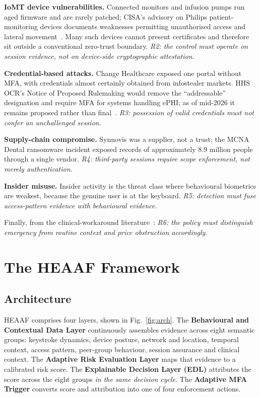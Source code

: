 \documentclass[conference]{IEEEtran}
\begin{document}
\textbf{IoMT device vulnerabilities.} Connected monitors and infusion pumps run
aged firmware and are rarely patched; CISA's advisory on Philips
patient-monitoring devices documents weaknesses permitting unauthorised access
and lateral movement~\cite{cisa2023}. Many such devices cannot present
certificates and therefore sit outside a conventional zero-trust boundary.
\emph{R2: the control must operate on session evidence, not on device-side
cryptographic attestation.}

\textbf{Credential-based attacks.} Change Healthcare exposed one portal without
MFA, with credentials almost certainly obtained from infostealer markets. HHS
OCR's Notice of Proposed Rulemaking would remove the ``addressable''
designation and require MFA for systems handling ePHI; as of mid-2026 it
remains proposed rather than final~\cite{hhsnprm}. \emph{R3: possession of valid
credentials must not confer an unchallenged session.}

\textbf{Supply-chain compromise.} Synnovis was a supplier, not a trust; the
MCNA Dental ransomware incident exposed records of approximately 8.9 million
people through a single vendor. \emph{R4: third-party sessions require scope
enforcement, not merely authentication.}

\textbf{Insider misuse.} Insider activity is the threat class where behavioural
biometrics are weakest, because the genuine user is at the keyboard.
\emph{R5: detection must fuse access-pattern evidence with behavioural
evidence.}

Finally, from the clinical-workaround literature~\cite{koppel2015}:
\emph{R6: the policy must distinguish emergency from routine context and price
obstruction accordingly.}
\section{The HEAAF Framework}
\label{sec:framework}

\subsection{Architecture}

HEAAF comprises four layers, shown in Fig.~\ref{fig:arch}. The
\textbf{Behavioural and Contextual Data Layer} continuously assembles evidence
across eight semantic groups: keystroke dynamics, device posture, network and
location, temporal context, access pattern, peer-group behaviour, session
assurance and clinical context. The \textbf{Adaptive Risk Evaluation Layer}
maps that evidence to a calibrated risk score. The \textbf{Explainable Decision
Layer (EDL)} attributes the score across the eight groups \emph{in the same
decision cycle}. The \textbf{Adaptive MFA Trigger} converts score and
attribution into one of four enforcement actions.
\end{document}
